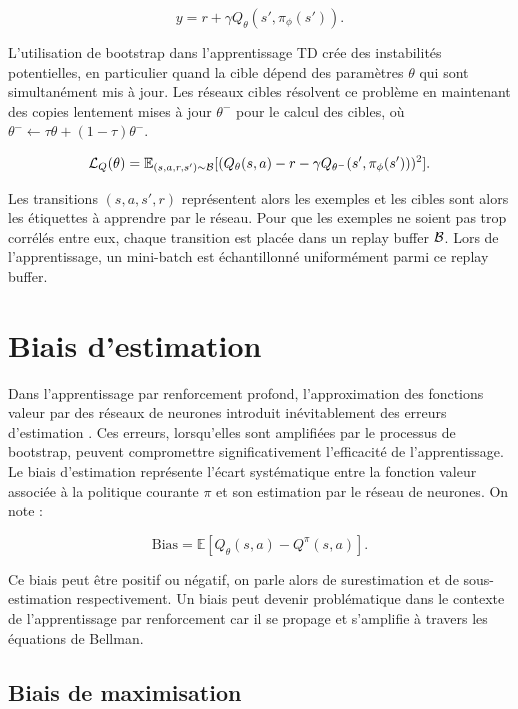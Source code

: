 \documentclass[a4paper, 12pt]{report}
\begin{document}
    $$
    y = r + \gamma Q_\theta (s', \pi_\phi (s')).
    $$

    L'utilisation de bootstrap dans l'apprentissage TD crée des instabilités
    potentielles, en particulier quand la cible dépend des paramètres $\theta$
    qui sont simultanément mis à jour. Les réseaux cibles résolvent ce problème
    en maintenant des copies lentement mises à jour $\theta^-$ pour le calcul
    des cibles, où $\theta^- \leftarrow \tau \theta + (1 - \tau) \theta^-$.

    $$
    {\cal{L}}_Q (\theta) = \mathbb{E}_{(s,a,r,s') \sim \cal{B}} [(Q_\theta (s, a) - r - \gamma Q_{\theta^-} (s', \pi_\phi (s')))^2 ].
    $$

    Les transitions $(s, a, s', r)$ représentent alors les exemples et les
    cibles sont alors les étiquettes à apprendre par le réseau. Pour que les
    exemples ne soient pas trop corrélés entre eux, chaque transition est
    placée dans un replay buffer $\cal{B}$. Lors de l'apprentissage, un
    mini-batch est échantillonné uniformément parmi ce replay buffer.

    \section{Biais d'estimation}

    Dans l'apprentissage par renforcement profond, l'approximation des
    fonctions valeur par des réseaux de neurones introduit inévitablement des
    erreurs d'estimation \cite{thrun1993issuesactionselection}. Ces erreurs,
    lorsqu'elles sont amplifiées par le processus de bootstrap, peuvent
    compromettre significativement l'efficacité de l'apprentissage. Le biais
    d'estimation représente l'écart systématique entre la fonction valeur
    associée à la politique courante $\pi$ et son estimation par le réseau de
    neurones. On note :

    $$
    \text{Bias} = \mathbb{E} [ Q_\theta (s, a) - Q^\pi (s, a)].
    $$

    Ce biais peut être positif ou négatif, on parle alors de surestimation et
    de sous-estimation respectivement. Un biais peut devenir problématique dans
    le contexte de l'apprentissage par renforcement car il se propage et
    s'amplifie à travers les équations de Bellman.

    \subsection{Biais de maximisation}
\end{document}
